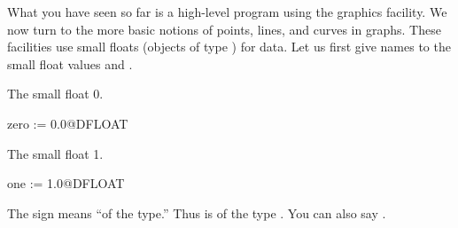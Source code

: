 %
What you have seen so far is a high-level program using the
graphics facility.
We now turn to the more basic notions of points, lines, and curves
in \threedim{} graphs.
These facilities use small floats (objects
of type ) for data.
Let us first give names to the small float values  and
.
\begin{xtc}
\begin{xtccomment}
The small float 0.
\end{xtccomment}
\begin{spadsrc}
zero := 0.0@DFLOAT 
\end{spadsrc}
\begin{TeXOutput}
\begin{fricasmath}{1}
%
\end{fricasmath}
\end{TeXOutput}
\end{xtc}
\begin{xtc}
\begin{xtccomment}
The small float 1.
\end{xtccomment}
\begin{spadsrc}
one  := 1.0@DFLOAT 
\end{spadsrc}
\begin{TeXOutput}
\begin{fricasmath}{2}
%
\end{fricasmath}
\end{TeXOutput}
\end{xtc}
The  sign means ``of the type.'' Thus  is
 of the type .
You can also say .

